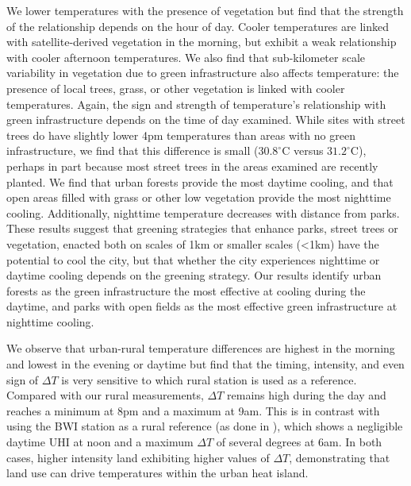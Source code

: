   

We lower temperatures with the presence of vegetation but find that the strength of the relationship depends on the hour of day. Cooler temperatures are linked with satellite-derived vegetation in the morning, but exhibit a weak relationship with cooler afternoon temperatures.  We also find that sub-kilometer scale variability in vegetation due to green infrastructure also affects temperature: the presence of local trees, grass, or other vegetation is linked with cooler temperatures. Again, the sign and strength of temperature's relationship with green infrastructure depends on the time of day examined. While sites with street trees do have slightly lower 4pm temperatures than areas with no green infrastructure, we find that this difference is small ($30.8^\circ$C versus $31.2^\circ$C), perhaps in part because most street trees in the areas examined are recently planted. We find that urban forests provide the most daytime cooling, and that open areas filled with grass or other low vegetation provide the most nighttime cooling. Additionally, nighttime temperature decreases with distance from parks. These results suggest that greening strategies that enhance parks, street trees or vegetation, enacted both on scales of 1km or smaller scales (<1km) have the potential to cool the city, but that whether the city experiences nighttime or daytime cooling depends on the greening strategy. Our results identify urban forests as the green infrastructure the most effective at cooling during the daytime, and parks with open fields as the most effective green infrastructure at nighttime cooling. 

We observe that urban-rural temperature differences are highest in the morning and lowest in the evening or daytime but find that the timing, intensity, and even sign of $\Delta T$ is very sensitive to which rural station is used as a reference. Compared with our rural measurements,  $\Delta T$ remains high during the day and reaches a minimum at 8pm and a maximum at 9am. This is in contrast with using the BWI station as a rural reference (as done in \citep{li2013synergistic}), which shows  a negligible daytime UHI at noon and a maximum $\Delta T$ of several degrees at 6am. In both cases, higher intensity land exhibiting higher values of $\Delta T$, demonstrating that land use can drive temperatures within the urban heat island.

